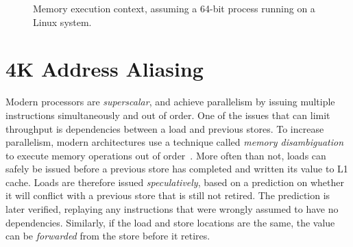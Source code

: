 \documentclass[10pt, conference, compsocconf]{IEEEtran}
\begin{document}
\begin{figure}
  \centering
  \caption{Memory execution context, assuming a 64-bit process running on a Linux system.}
  \label{fig:virtualmemory}
\end{figure}


\section{4K Address Aliasing}
\label{sec:aliasing}
Modern processors are \emph{superscalar}, and achieve parallelism by issuing multiple instructions simultaneously and out of order.
One of the issues that can limit throughput is dependencies between a load and previous stores.
To increase parallelism, modern architectures use a technique called \emph{memory disambiguation} to execute memory operations out of order~\cite{Intel:2006:InsideICM:SmartMemoryAccess}. 
More often than not, loads can safely be issued before a previous store has completed and written its value to L1 cache.
Loads are therefore issued \emph{speculatively}, based on a prediction on whether it will conflict with a previous store that is still not retired.
The prediction is later verified, replaying any instructions that were wrongly assumed to have no dependencies.
Similarly, if the load and store locations are the same, the value can be \emph{forwarded} from the store before it retires.
\end{document}
